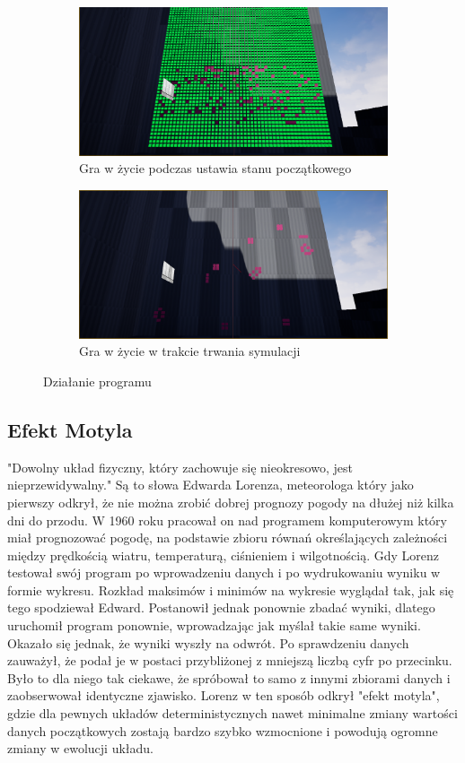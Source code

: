 \documentclass[a4paper,12pt,reqno]{article}
\begin{document}
\begin{figure}[H]%
	\centering
	\begin{subfigure}{.5\textwidth}
		\centering
		\includegraphics[width=0.8\linewidth]{graphics/GOLInUE_1.png}
		\caption{Gra w życie podczas ustawia stanu początkowego}	
		\label{ref:subref_a}
	\end{subfigure}%
	\begin{subfigure}{.5\textwidth}
		\centering
		\includegraphics[width=0.8\linewidth]{graphics/GOLInUE_2.png}
		\caption{Gra w życie w trakcie trwania symulacji}
		\label{ref:subref_b}
	\end{subfigure}%
	

\caption{Działanie programu}
\label{ref:ref}
\end{figure}

\subsection{Efekt Motyla}

"Dowolny układ fizyczny, który zachowuje się nieokresowo, jest nieprzewidywalny." Są to słowa Edwarda Lorenza, meteorologa który jako pierwszy odkrył, że nie można zrobić dobrej prognozy pogody na dłużej niż kilka dni do przodu. W 1960 roku pracował on nad programem komputerowym który miał prognozować pogodę, na podstawie zbioru równań określających zależności między prędkością wiatru, temperaturą, ciśnieniem i wilgotnością. Gdy Lorenz testował swój program po wprowadzeniu danych i po wydrukowaniu wyniku w formie wykresu. Rozkład maksimów i minimów na wykresie wyglądał tak, jak się tego spodziewał Edward. Postanowił jednak ponownie zbadać wyniki, dlatego uruchomił program ponownie, wprowadzając jak myślał takie same wyniki. Okazało się jednak, że wyniki wyszły na odwrót. Po sprawdzeniu danych zauważył, że podał je w postaci przybliżonej z mniejszą liczbą cyfr po przecinku. Było to dla niego tak ciekawe, że spróbował to samo z innymi zbiorami danych i zaobserwował identyczne zjawisko. Lorenz w ten sposób odkrył "efekt motyla", gdzie dla pewnych układów deterministycznych nawet minimalne zmiany wartości danych początkowych zostają bardzo szybko wzmocnione i powodują ogromne zmiany w ewolucji układu\cite{burze_motyle}.
\end{document}
